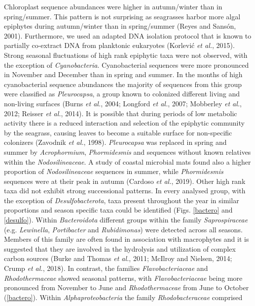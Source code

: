 \documentclass[12pt,]{article}
\begin{document}
Chloroplast sequence abundances were higher in autumn/winter than in
spring/summer. This pattern is not surprising as seagrasses harbor more
algal epiphytes during autumn/winter than in spring/summer (Reyes and
Sansón, 2001). Furthermore, we used an adapted DNA isolation protocol
that is known to partially co-extract DNA from planktonic eukaryotes
(Korlević \emph{et al.}, 2015). Strong seasonal fluctuations of high
rank epiphytic taxa were not observed, with the exception of
\emph{Cyanobacteria}. Cyanobacterial sequences were more pronounced in
November and December than in spring and summer. In the months of high
cyanobacterial sequence abundances the majority of sequences from this
group were classified as \emph{Pleurocapsa}, a group known to colonized
different living and non-living surfaces (Burns \emph{et al.}, 2004;
Longford \emph{et al.}, 2007; Mobberley \emph{et al.}, 2012; Reisser
\emph{et al.}, 2014). It is possible that during periods of low
metabolic activity there is a reduced interaction and selection of the
epiphytic community by the seagrass, causing leaves to become a suitable
surface for non-specific colonizers (Zavodnik \emph{et al.}, 1998).
\emph{Pleurocapsa} was replaced in spring and summer by
\emph{Acrophormium}, \emph{Phormidesmis} and sequences without known
relatives within the \emph{Nodosilineaceae}. A study of coastal
microbial mats found also a higher proportion of \emph{Nodosilineaceae}
sequences in summer, while \emph{Phormidesmis} sequences were at their
peak in autumn (Cardoso \emph{et al.}, 2019). Other high rank taxa did
not exhibit strong successional patterns. In every analysed group, with
the exception of \emph{Desulfobacterota}, taxa present throughout the
year in similar proportions and season specific taxa could be identified
(Figs. \ref{bactero} and \ref{desulfo}). Within \emph{Bacteroidota}
different groups within the family \emph{Saprospiraceae} (e.g.
\emph{Lewinella}, \emph{Portibacter} and \emph{Rubidimonas}) were
detected across all seasons. Members of this family are often found in
association with macrophytes and it is suggested that they are involved
in the hydrolysis and utilization of complex carbon sources (Burke and
Thomas \emph{et al.}, 2011; McIlroy and Nielsen, 2014; Crump \emph{et
al.}, 2018). In contrast, the families \emph{Flavobacteriaceae} and
\emph{Rhodothermaceae} showed seasonal patterns, with
\emph{Flavobacteriaceae} being more pronounced from November to June and
\emph{Rhodothermaceae} from June to October (\autoref{bactero}). Within
\emph{Alphaproteobacteria} the family \emph{Rhodobacteraceae} comprised
\end{document}
